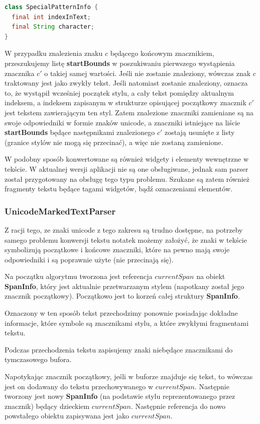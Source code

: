 \begin{lstlisting}[language=Java]
class SpecialPatternInfo {
  final int indexInText;
  final String character;
}
\end{lstlisting}

W przypadku znalezienia znaku $c$ będącego końcowym znacznikiem, przeszukujemy listę \textbf{startBounds} w poszukiwaniu pierwszego wystąpienia znacznika $c'$ o takiej samej wartości. Jeśli nie zostanie znaleziony, wówczas znak $c$ traktowany jest jako zwykły tekst. Jeśli natomiast zostanie znaleziony, oznacza to, że wystąpił wcześniej początek stylu, a cały tekst pomiędzy aktualnym indeksem, a indeksem zapisanym w strukturze opisującej początkowy znacznik $c'$ jest tekstem zawierającym ten styl. Zatem znalezione znaczniki zamieniane są na swoje odpowiedniki w formie znaków unicode, a znaczniki istniejące na liście \textbf{startBounds} będące następnikami znalezionego $c'$ zostają usunięte z listy (granice stylów nie mogą się przecinać), a więc nie zostaną zamienione.

W podobny sposób konwertowane są również widgety i elementy wewnętrzne w tekście. W aktualnej wersji aplikacji nie są one obsługiwane, jednak sam parser został przygotowany na obsługę tego typu problemu. Szukane są zatem również fragmenty tekstu będące tagami widgetów, bądź oznaczeniami elementów.

\subsubsection{UnicodeMarkedTextParser}

Z racji tego, ze znaki unicode z tego zakresu są trudno dostępne, na potrzeby samego problemu konwersji tekstu notatek możemy założyć, że znaki w tekście symbolizują początkowe i końcowe znaczniki, które na pewno mają swoje odpowiedniki i są poprawnie użyte (nie przecinają się).

Na początku algorytmu tworzona jest referencja $currentSpan$ na obiekt \textbf{SpanInfo}, który jest aktualnie przetwarzanym stylem (napotkany został jego znacznik początkowy). Początkowo jest to korzeń całej struktury \textbf{SpanInfo}.

Oznaczony w ten sposób tekst przechodzimy ponownie posiadając dokładne informacje, które symbole są znacznikami stylu, a które zwykłymi fragmentami tekstu.

Podczas przechodzenia tekstu zapisujemy znaki niebędące znacznikami do tymczasowego bufora.

Napotykając znacznik początkowy, jeśli w buforze znajduje się tekst, to wówczas jest on dodawany do tekstu przechowywanego w $currentSpan$. Następnie tworzony jest nowy \textbf{SpanInfo} (na podstawie stylu reprezentowanego przez znacznik) będący dzieckiem $currentSpan$. Następnie referencja do nowo powstałego obiektu zapisywana jest jako $currentSpan$. 

